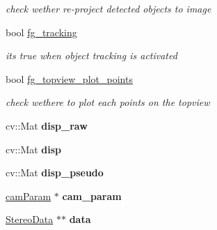 \begin{DoxyCompactItemize}
\begin{DoxyCompactList}\small\item\em check wether re-\/project detected objects to image \end{DoxyCompactList}\item 
\hypertarget{classstereo__vision_aa887dac1c609d96131aba8c2c386b8b4}{}bool \hyperlink{classstereo__vision_aa887dac1c609d96131aba8c2c386b8b4}{fg\+\_\+tracking}\label{classstereo__vision_aa887dac1c609d96131aba8c2c386b8b4}

\begin{DoxyCompactList}\small\item\em it\textquotesingle{}s true when object tracking is activated \end{DoxyCompactList}\item 
\hypertarget{classstereo__vision_af3c1db66e4aee9b6cb699ad83208017e}{}bool \hyperlink{classstereo__vision_af3c1db66e4aee9b6cb699ad83208017e}{fg\+\_\+topview\+\_\+plot\+\_\+points}\label{classstereo__vision_af3c1db66e4aee9b6cb699ad83208017e}

\begin{DoxyCompactList}\small\item\em check wethere to plot each points on the topview \end{DoxyCompactList}\item 
\hypertarget{classstereo__vision_a208843ce79040143215a89c09441fac6}{}cv\+::\+Mat {\bfseries disp\+\_\+raw}\label{classstereo__vision_a208843ce79040143215a89c09441fac6}

\item 
\hypertarget{classstereo__vision_aff10e9a2deaad5be0fe0f5282a40d89d}{}cv\+::\+Mat {\bfseries disp}\label{classstereo__vision_aff10e9a2deaad5be0fe0f5282a40d89d}

\item 
\hypertarget{classstereo__vision_a9bc79f927c68742c44ed169dd0ac7c0c}{}cv\+::\+Mat {\bfseries disp\+\_\+pseudo}\label{classstereo__vision_a9bc79f927c68742c44ed169dd0ac7c0c}

\item 
\hypertarget{classstereo__vision_a116de235ec3af6a1fbf32e53553e7fff}{}\hyperlink{structstereo__vision_1_1cam_param}{cam\+Param} $\ast$ {\bfseries cam\+\_\+param}\label{classstereo__vision_a116de235ec3af6a1fbf32e53553e7fff}

\item 
\hypertarget{classstereo__vision_abe67917e4552e10eec02cf1df85548bd}{}\hyperlink{structstereo__vision_1_1_stereo_data}{Stereo\+Data} $\ast$$\ast$ {\bfseries data}\label{classstereo__vision_abe67917e4552e10eec02cf1df85548bd}


\end{DoxyCompactItemize}

